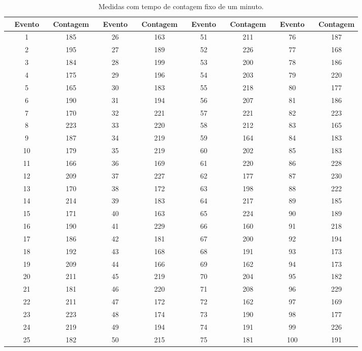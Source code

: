 \documentclass{article}
\begin{document}
\begin{table}[ht]
    \centering
    \begin{tabular}{|c|c|c|c|c|c|c|c|}
    \hline
    \rowcolor{cinzaclaro}
~ \textbf{Evento} ~ & \textbf{Contagem}& ~ \textbf{Evento} ~ & \textbf{Contagem} & ~ \textbf{Evento} ~ & \textbf{Contagem} & ~ \textbf{Evento} ~ & \textbf{Contagem} \\ \hline
1 & 185 & 26 & 163 & 51 & 211 & 76 & 187 \\ \hline
2 & 195 & 27 & 189 & 52 & 226 & 77 & 168 \\ \hline
3 & 184 & 28 & 199 & 53 & 200 & 78 & 186 \\ \hline
4 & 175 & 29 & 196 & 54 & 203 & 79 & 220 \\ \hline
5 & 165 & 30 & 183 & 55 & 218 & 80 & 177 \\ \hline
6 & 190 & 31 & 194 & 56 & 207 & 81 & 186 \\ \hline
7 & 170 & 32 & 221 & 57 & 221 & 82 & 223 \\ \hline
8 & 223 & 33 & 220 & 58 & 212 & 83 & 165 \\ \hline
9 & 187 & 34 & 219 & 59 & 164 & 84 & 183 \\ \hline
10 & 179 & 35 & 219 & 60 & 202 & 85 & 183 \\ \hline
11 & 166 & 36 & 169 & 61 & 220 & 86 & 228 \\ \hline
12 & 209 & 37 & 227 & 62 & 177 & 87 & 230 \\ \hline
13 & 170 & 38 & 172 & 63 & 198 & 88 & 222 \\ \hline
14 & 214 & 39 & 183 & 64 & 217 & 89 & 185 \\ \hline
15 & 171 & 40 & 163 & 65 & 224 & 90 & 189 \\ \hline
16 & 190 & 41 & 229 & 66 & 160 & 91 & 218 \\ \hline
17 & 186 & 42 & 181 & 67 & 200 & 92 & 194 \\ \hline
18 & 192 & 43 & 168 & 68 & 191 & 93 & 173 \\ \hline
19 & 209 & 44 & 166 & 69 & 162 & 94 & 173 \\ \hline
20 & 211 & 45 & 219 & 70 & 204 & 95 & 182 \\ \hline
21 & 181 & 46 & 220 & 71 & 208 & 96 & 229 \\ \hline
22 & 211 & 47 & 172 & 72 & 162 & 97 & 169 \\ \hline
23 & 223 & 48 & 174 & 73 & 190 & 98 & 177 \\ \hline
24 & 219 & 49 & 194 & 74 & 191 & 99 & 226 \\ \hline
25 & 182 & 50 & 215 & 75 & 181 & 100 & 191 \\ \hline
    \end{tabular}
\caption{Medidas com tempo de contagem fixo de um minuto.}
    \label{tabela_1}
\end{table}
\end{document}
